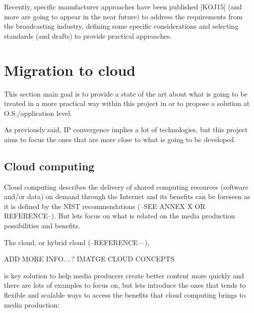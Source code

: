 Recently, specific manufacturer approaches have been published [KOJ15] (and more are going to
appear in the near future) to address the requirements from the broadcasting industry, defining some
specific considerations and selecting standards (and drafts) to provide practical approaches.


\section{Migration to cloud}

This section main goal is to provide a state of the art about what is going to be treated in a more practical way within this project in or to propose a solution at O.S./application level.

As previously said, IP convergence implies a lot of technologies, but this project aims to focus the ones that are more close to what is going to be developed.

\subsection{Cloud computing}

Cloud computing describes the delivery of shared computing resources (software and/or data) on demand through the Internet and its benefits can be foreseen as it is defined by the NIST recommendations (--SEE ANNEX X OR REFERENCE--). But lets focus on what is related on the media production possibilities and benefits.

The cloud, or hybrid cloud (--REFERENCE---), 

ADD MORE INFO....? IMATGE CLOUD CONCEPTS

is key solution to help media producers create better content more quickly and there are lots of examples to focus on, but lets introduce the ones that tends to flexible and scalable ways to access the benefits that cloud computing brings to media production:

